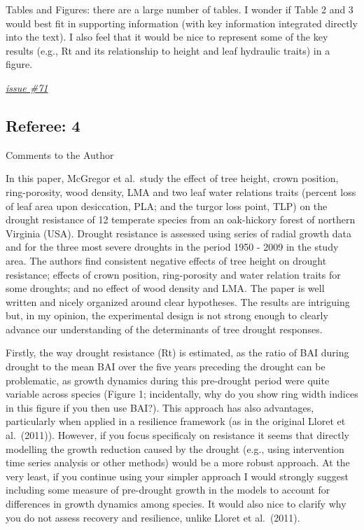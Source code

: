 \documentclass[
]{article}
\begin{document}
Tables and Figures: there are a large number of tables. I wonder if
Table 2 and 3 would best fit in supporting information (with key
information integrated directly into the text). I also feel that it
would be nice to represent some of the key results (e.g., Rt and its
relationship to height and leaf hydraulic traits) in a figure.

\href{https://github.com/SCBI-ForestGEO/McGregor_climate-sensitivity-variation/issues/71}{\emph{issue
\#71}}

\hypertarget{referee-4}{%
\subsection{Referee: 4}\label{referee-4}}

Comments to the Author

In this paper, McGregor et al.~study the effect of tree height, crown
position, ring-porosity, wood density, LMA and two leaf water relations
traits (percent loss of leaf area upon desiccation, PLA; and the turgor
loss point, TLP) on the drought resistance of 12 temperate species from
an oak-hickory forest of northern Virginia (USA). Drought resistance is
assessed using series of radial growth data and for the three most
severe droughts in the period 1950 - 2009 in the study area. The authors
find consistent negative effects of tree height on drought resistance;
effects of crown position, ring-porosity and water relation traits for
some droughts; and no effect of wood density and LMA. The paper is well
written and nicely organized around clear hypotheses. The results are
intriguing but, in my opinion, the experimental design is not strong
enough to clearly advance our understanding of the determinants of tree
drought responses.

Firstly, the way drought resistance (Rt) is estimated, as the ratio of
BAI during drought to the mean BAI over the five years preceding the
drought can be problematic, as growth dynamics during this pre-drought
period were quite variable across species (Figure 1; incidentally, why
do you show ring width indices in this figure if you then use BAI?).
This approach has also advantages, particularly when applied in a
resilience framework (as in the original Lloret et al.~(2011)). However,
if you focus specificaly on resistance it seems that directly modelling
the growth reduction caused by the drought (e.g., using intervention
time series analysis or other methods) would be a more robust approach.
At the very least, if you continue using your simpler approach I would
strongly suggest including some measure of pre-drought growth in the
models to account for differences in growth dynamics among species. It
would also nice to clarify why you do not assess recovery and
resilience, unlike Lloret et al.~(2011).
\end{document}
